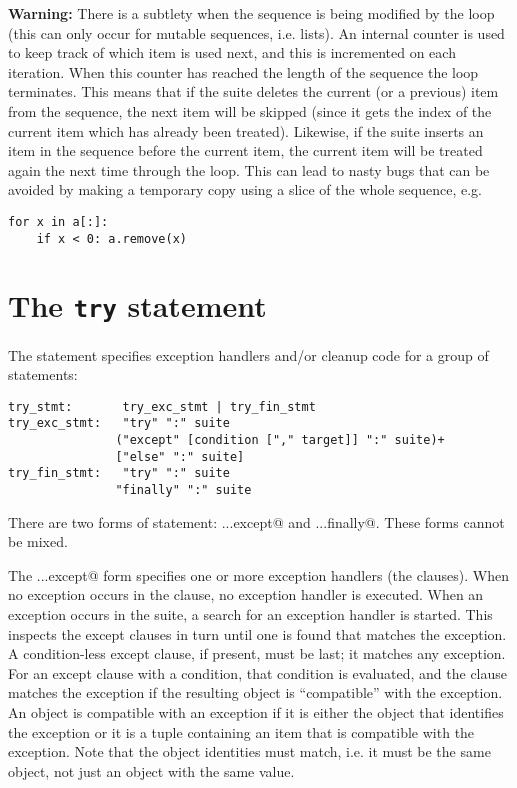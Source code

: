 {\bf Warning:} There is a subtlety when the sequence is being modified
by the loop (this can only occur for mutable sequences, i.e. lists).
An internal counter is used to keep track of which item is used next,
and this is incremented on each iteration.  When this counter has
reached the length of the sequence the loop terminates.  This means that
if the suite deletes the current (or a previous) item from the
sequence, the next item will be skipped (since it gets the index of
the current item which has already been treated).  Likewise, if the
suite inserts an item in the sequence before the current item, the
current item will be treated again the next time through the loop.
This can lead to nasty bugs that can be avoided by making a temporary
copy using a slice of the whole sequence, e.g.

\begin{verbatim}
for x in a[:]:
    if x < 0: a.remove(x)
\end{verbatim}

\section{The {\tt try} statement} \label{try}

The \verb@try@ statement specifies exception handlers and/or cleanup
code for a group of statements:

\begin{verbatim}
try_stmt:       try_exc_stmt | try_fin_stmt
try_exc_stmt:   "try" ":" suite
               ("except" [condition ["," target]] ":" suite)+
               ["else" ":" suite]
try_fin_stmt:   "try" ":" suite
               "finally" ":" suite
\end{verbatim}

There are two forms of \verb@try@ statement: \verb@try...except@ and
\verb@try...finally@.  These forms cannot be mixed.

The \verb@try...except@ form specifies one or more exception handlers
(the \verb@except@ clauses).  When no exception occurs in the
\verb@try@ clause, no exception handler is executed.  When an
exception occurs in the \verb@try@ suite, a search for an exception
handler is started.  This inspects the except clauses in turn until
one is found that matches the exception.  A condition-less except
clause, if present, must be last; it matches any exception.  For an
except clause with a condition, that condition is evaluated, and the
clause matches the exception if the resulting object is ``compatible''
with the exception.  An object is compatible with an exception if it
is either the object that identifies the exception or it is a tuple
containing an item that is compatible with the exception.  Note that
the object identities must match, i.e. it must be the same object, not
just an object with the same value.

